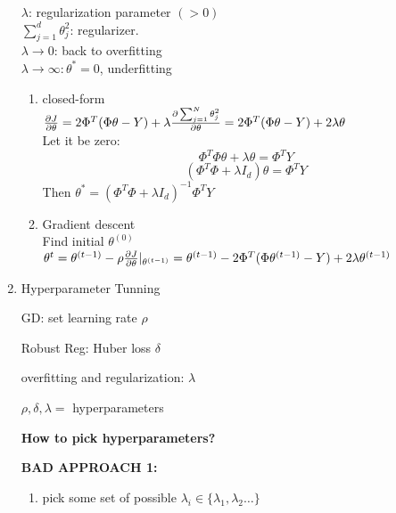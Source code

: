 \documentclass[12pt]{article}
\begin{document}
\begin{multicols}{2}
\begin{enumerate}
            $\lambda$: regularization parameter $(> 0)$\\
            $\sum_{j = 1}^d \theta_j^2$: regularizer.\\      
            $\lambda \rightarrow 0$: back to overfitting \\
            $\lambda \rightarrow \infty: \theta^* = 0$, underfitting
            \begin{enumerate}
                \item closed-form \\
                    $\frac{\partial J}{\partial \theta} \\
                    = 2 \Phi^T(\Phi \theta - Y) + \lambda \frac{\partial \sum_{j = 1}^N \theta_j^2}{\partial \theta} \\
                    = 2\Phi^T(\Phi \theta - Y) + 2\lambda \theta$\\
                    Let it be zero:
                    $$\Phi^T \Phi \theta + \lambda \theta = \Phi^T Y$$
                    $$(\Phi^T \Phi + \lambda I_d )\theta = \Phi^T Y$$
                    Then $\theta^* = (\Phi^T \Phi + \lambda I_d )^{-1}\Phi^T Y$
                \item Gradient descent \\
                    Find initial $\theta^{(0)}$\\
                    $\theta^{t} = \theta^{(t-1)} - \rho \frac{\partial J}{\partial \theta}|_{\theta^{(t-1)}} \\
                    = \theta^{(t-1)} - 2\Phi^T(\Phi \theta^{(t-1)} - Y) + 2\lambda \theta^{(t-1)}$
            \end{enumerate}

            \item Hyperparameter Tunning
            
            GD: set learning rate $\rho$

            Robust Reg: Huber loss $\delta$

            overfitting and regularization: $\lambda$

            $\rho, \delta, \lambda = $ hyperparameters

            \textbf{How to pick hyperparameters?}

            \textbf{BAD APPROACH 1:}

            \begin{enumerate}
                \item pick some set of possible $\lambda_i \in \{\lambda_1, \lambda_2 \dots\}$
                

\end{enumerate}
\end{enumerate}
\end{multicols}
\end{document}
